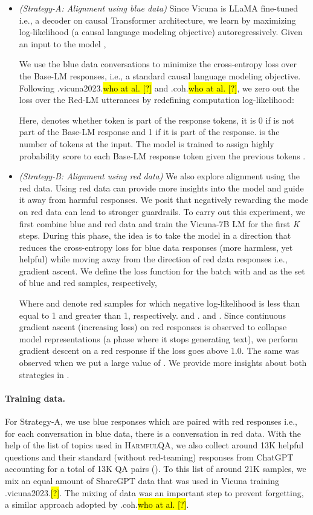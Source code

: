 \documentclass{article}
\newcommand{\dataset}{\textsc{HarmfulQA}}
\let\realcite\cite
\renewcommand{\cite}[1]{\ifx.#1.\hl{[?]}\else\realcite{#1}\fi}
\let\realcitet\citet
\renewcommand{\citet}[1]{\ifx.#1.\hl{who at al. [?]}\else\realcitet{#1}\fi}
\begin{document}
{\begin{itemize}
    \item \textit{(Strategy-A: Alignment using blue data)} Since Vicuna is LLaMA fine-tuned i.e., a decoder on causal Transformer architecture, we learn by maximizing log-likelihood (a causal language modeling objective) autoregressively. Given an input to the model , 
    

We use the blue data conversations to minimize the cross-entropy loss over the Base-LM responses, i.e., a standard causal language modeling objective. Following \citet{vicuna2023} and \citet{coh}, we zero out the loss over the Red-LM utterances by redefining computation log-likelihood:

Here,  denotes whether token  is part of the response tokens, it is 0 if  is not part of the Base-LM response and 1 if it is part of the response.  is the number of tokens at the input. The model is trained to assign highly probability score to each Base-LM response token  given the previous tokens .

\item \textit{(Strategy-B: Alignment using red data)} We also explore alignment using the red data. Using red data can provide more insights into the model and guide it away from harmful responses. We posit that negatively rewarding the mode on red data can lead to stronger guardrails. To carry out this experiment, we first combine blue and red data and train the Vicuna-7B LM for the first \textit{K} steps. During this phase, the idea is to take the model in a direction that reduces the cross-entropy loss for blue data responses (more harmless, yet helpful) while moving away from the direction of red data responses i.e., gradient ascent. We define the loss function for the batch with  and  as the set of blue and red samples, respectively,

Where  and  denote red samples for which negative log-likelihood is less than equal to 1 and greater than 1, respectively.  and .  and . Since continuous gradient ascent (increasing loss) on red responses is observed to collapse model representations (a phase where it stops generating text), we perform gradient descent on a red response if the loss goes above 1.0. The same was observed when we put a large value of . We provide more insights about both strategies in .

\end{itemize}


\paragraph{Training data.} For Strategy-A, we use blue responses which are paired with red responses i.e., for each conversation in blue data, there is a conversation in red data. With the help of the list of topics used in \dataset{}, we also collect around 13K helpful questions and their standard (without red-teaming) responses from ChatGPT accounting for a total of 13K QA pairs (). To this list of around 21K samples, we mix an equal amount of ShareGPT data that was used in Vicuna training \cite{vicuna2023}. The mixing of data was an important step to prevent forgetting, a similar approach adopted by \citet{coh}.

}
\end{document}
